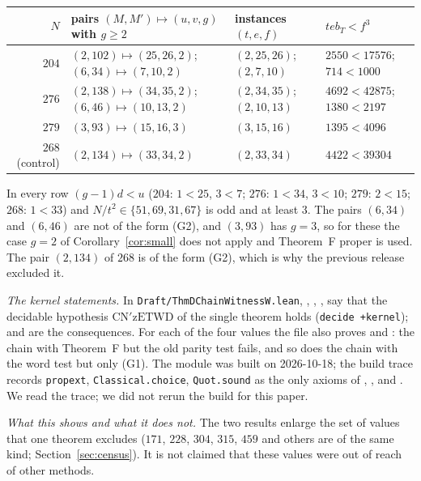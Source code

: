 \documentclass[11pt,reqno]{amsart}
\theoremstyle{plain}
\theoremstyle{definition}
\begin{document}
\begin{center}
\small
\begin{tabular}{r l l l}
\hline
$N$ & pairs $(M,M')\mapsto(u,v,g)$ with $g\ge2$ & instances $(t,e,f)$ & $teb_T<f^3$\\
\hline
$204$ & $(2,102)\mapsto(25,26,2)$;\ $(6,34)\mapsto(7,10,2)$ & $(2,25,26)$;\ $(2,7,10)$ & $2550<17576$;\ $714<1000$\\
$276$ & $(2,138)\mapsto(34,35,2)$;\ $(6,46)\mapsto(10,13,2)$ & $(2,34,35)$;\ $(2,10,13)$ & $4692<42875$;\ $1380<2197$\\
$279$ & $(3,93)\mapsto(15,16,3)$ & $(3,15,16)$ & $1395<4096$\\
$268$ (control) & $(2,134)\mapsto(33,34,2)$ & $(2,33,34)$ & $4422<39304$\\
\hline
\end{tabular}
\end{center}
In every row $(g-1)d<u$ ($204$: $1<25$, $3<7$; $276$: $1<34$, $3<10$; $279$: $2<15$; $268$: $1<33$) and $N/t^2\in\{51,69,31,67\}$ is odd and at least $3$. The pairs $(6,34)$ and $(6,46)$ are not of the form (G2), and $(3,93)$ has $g=3$, so for these the case $g=2$ of Corollary~\ref{cor:small} does not apply and Theorem~F proper is used. The pair $(2,134)$ of $268$ is of the form (G2), which is why the previous release excluded it.

\emph{The kernel statements.} In \texttt{Draft/ThmDChainWitnessW.lean}, , , ,  say that the decidable hypothesis $\mathrm{CN'zETWD}$ of the single theorem  holds (\texttt{decide +kernel});  and  are the consequences. For each of the four values the file also proves  and : the chain with Theorem~F but the old parity test fails, and so does the chain with the word test but only (G1). The module was built on 2026-10-18; the build trace records \texttt{propext}, \texttt{Classical.choice}, \texttt{Quot.sound} as the only axioms of , ,  and . We read the trace; we did not rerun the build for this paper.

\emph{What this shows and what it does not.} The two results enlarge the set of values that one theorem excludes ($171$, $228$, $304$, $315$, $459$ and others are of the same kind; Section~\ref{sec:census}). It is not claimed that these values were out of reach of other methods.
\end{document}
